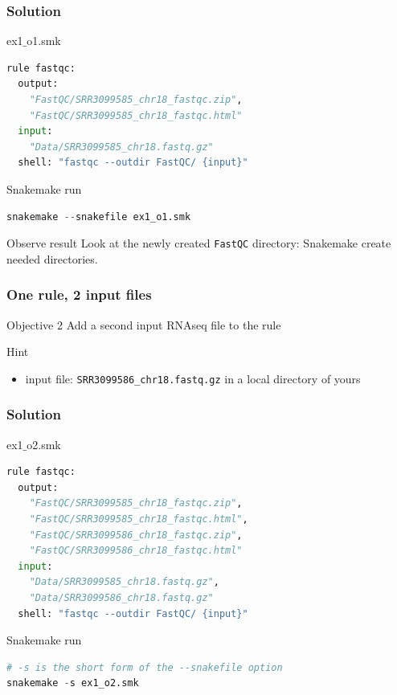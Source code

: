 \begin{frame}[containsverbatim]
\frametitle{Solution}
\begin{exampleblock}{ex1$\_$o1.smk}
\begin{lstlisting}[language=python]
rule fastqc:
  output:
    "FastQC/SRR3099585_chr18_fastqc.zip", 
    "FastQC/SRR3099585_chr18_fastqc.html"
  input:
    "Data/SRR3099585_chr18.fastq.gz"
  shell: "fastqc --outdir FastQC/ {input}"
\end{lstlisting}
\end{exampleblock}
\begin{exampleblock}{Snakemake run}
\begin{lstlisting}[language=python]
snakemake --snakefile ex1_o1.smk
\end{lstlisting}
\end{exampleblock}
\begin{exampleblock}{Observe result}
Look at the newly created \verb|FastQC| directory: Snakemake create needed directories.
\end{exampleblock}
\end{frame}
\begin{frame}[containsverbatim]
\frametitle{One rule, 2 input files}
\begin{exampleblock}{Objective 2}
Add a second input RNAseq file to the rule
\end{exampleblock}
\begin{exampleblock}{Hint}
\begin{itemize}
    \item input file: \verb|SRR3099586_chr18.fastq.gz| in a local directory of yours
\end{itemize}
\end{exampleblock}
\end{frame}
\begin{frame}[containsverbatim]
\frametitle{Solution}
\begin{exampleblock}{ex1$\_$o2.smk}
\begin{lstlisting}[language=python]
rule fastqc:
  output:
    "FastQC/SRR3099585_chr18_fastqc.zip", 
    "FastQC/SRR3099585_chr18_fastqc.html",
    "FastQC/SRR3099586_chr18_fastqc.zip", 
    "FastQC/SRR3099586_chr18_fastqc.html"
  input:
    "Data/SRR3099585_chr18.fastq.gz",
    "Data/SRR3099586_chr18.fastq.gz"
  shell: "fastqc --outdir FastQC/ {input}"
\end{lstlisting}
\end{exampleblock}
\begin{exampleblock}{Snakemake run}
\begin{lstlisting}[language=python]
# -s is the short form of the --snakefile option
snakemake -s ex1_o2.smk
\end{lstlisting}
\end{exampleblock}
\end{frame}
